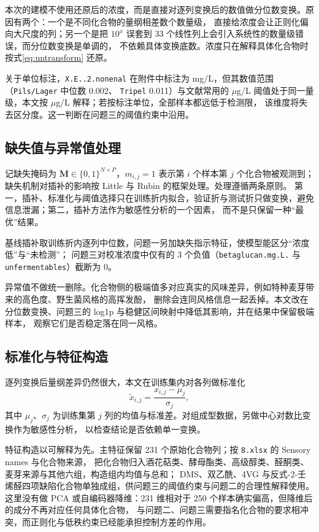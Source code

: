 ﻿\documentclass[UTF8,a4paper,zihao=-4]{ctexart}
\numberwithin{figure}{section}
\numberwithin{table}{section}
\numberwithin{equation}{section}
\newcommand{\file}[1]{\texttt{#1}}
\newcommand{\bM}{\bm{M}}
\begin{document}
本次的建模不使用还原后的浓度，而是直接对逐列变换后的数值做分位数变换。原因有两个：一个是不同化合物的量纲相差数个数量级，
直接给浓度会让正则化偏向大尺度的列；另一个是把 $10^{x}$ 误套到 33 个线性列上会引入系统性的数量级错误，而分位数变换是单调的，
不依赖具体变换底数。浓度只在解释具体化合物时按式\eqref{eq:untransform} 还原。

关于单位标注，\file{X.E..2.nonenal} 在附件中标注为 mg/L，但其数值范围（\file{Pils/Lager} 中位数 0.002、
\file{Tripel} 0.011）与文献常用的 $\mu$g/L 阈值处于同一量级，本文按 $\mu$g/L 解释；若按标注单位，全部样本都远低于检测限，
该维度将失去区分度。这一判断在问题三的阈值约束中沿用。

\subsection{缺失值与异常值处理}

记缺失掩码为 $\bM\in\{0,1\}^{N\times P}$，$m_{i,j}=1$ 表示第 $i$ 个样本第 $j$ 个化合物被观测到；缺失机制对插补的影响按 Little 与 Rubin 的框架处理\cite{little2019}。处理遵循两条原则。
第一，插补、标准化与阈值选择只在训练折内拟合，验证折与测试折只做变换，避免信息泄漏；第二，插补方法作为敏感性分析的一个因素，
而不是只保留一种“最优”结果。

基线插补取训练折内逐列中位数，问题一另加缺失指示特征，使模型能区分“浓度低”与“未检测”；
问题三对校准浓度中仅有的 3 个负值（\file{betaglucan.mg.L.} 与 \file{unfermentables}）截断为 0。

异常值不做统一删除。化合物侧的极端值多对应真实的风味差异，例如特种麦芽带来的高色度、野生菌风格的高挥发酚，
删除会连同风格信息一起丢掉。本文改在分位数变换、问题三的 log1p 与稳健区间映射中降低其影响，并在结果中保留极端样本，
观察它们是否稳定落在同一风格。

\subsection{标准化与特征构造}

逐列变换后量纲差异仍然很大，本文在训练集内对各列做标准化
\begin{equation}
\tilde{x}_{i,j}=\frac{x_{i,j}-\mu_j}{\sigma_j},
\label{eq:standardize}
\end{equation}
其中 $\mu_j$、$\sigma_j$ 为训练集第 $j$ 列的均值与标准差。对组成型数据，另做中心对数比变换作为敏感性分析，
以检查结论是否依赖单一变换。

特征构造以可解释为先。主特征保留 231 个原始化合物列；按 \file{8.xlsx} 的 Sensory names 与化合物来源，
把化合物归入酒花萜类、酵母酯类、高级醇类、醛酮类、麦芽来源与其他六组，构造组内均值与总和；
DMS、双乙酰、4VG 与反式-2-壬烯醛四项缺陷化合物单独成组，供问题三的阈值约束与问题二的合理性解释使用。
这里没有做 PCA 或自编码器降维：231 维相对于 250 个样本确实偏高，但降维后的成分不再对应任何具体化合物，
与问题二、问题三需要指名化合物的要求相冲突，而正则化与低秩约束已经能承担控制方差的作用。
\end{document}
